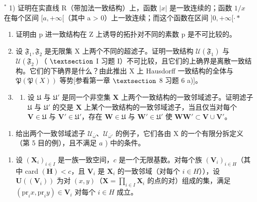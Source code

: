 \BourbakiExerciseGroup

\(^{*}\) 1) 证明在实直线 R（带加法一致结构）上，函数 \(|x|\) 是一致连续的；函数 \(1/x\) 在每个区间 \([a, +\infty[\)（其中 a \textgreater{} 0）上一致连续；而这个函数在区间 \(]0, +\infty[\cdot*\)

\begin{enumerate}
\def\labelenumi{\arabic{enumi})}
\setcounter{enumi}{1}
\item
  证明由 p 进一致结构在 Z 上诱导的拓扑对不同的素数 p 是不可比较的。
\item
  设 \(\mathfrak{F}_1, \mathfrak{F}_2\) 是无限集 X 上两个不同的超滤子。证明一致结构 \(\mathcal{U}(\mathfrak{F}_1)\) 与 \(\mathcal{U}(\mathfrak{F}_2)\)（ \(\S\) I 习题 I）不可比较，且它们的上确界是离散一致结构。它们的下确界是什么？由此推出 X 上 Hausdorff 一致结构的全体与 \(\mathfrak{P}(\mathfrak{P}(X))\) 等势{[}参看第一章 \(\S\) 8 习题 6 a){]}。
\item
  \begin{enumerate}
  \def\labelenumii{\alph{enumii})}
  \tightlist
  \item
    设 \(\mathfrak{U}\) 与 \(\mathfrak{U}'\) 是同一个非空集 \(\mathbf{X}\) 上两个一致结构的一致邻域滤子。证明滤子 \(\mathfrak{U}\) 与 \(\mathfrak{U}'\) 的交是 \(\mathbf{X}\) 上某个一致结构的一致邻域滤子，当且仅当对每个 \(\mathbf{V} \in \mathfrak{U}\) 与 \(\mathbf{V}' \in \mathfrak{U}'\)，存在 \(\mathbf{W} \in \mathfrak{U}\) 与 \(\mathbf{W}' \in \mathfrak{U}'\) 使 \(\mathbf{WW}' \subset \mathbf{V} \cup \mathbf{V}'\)。
  \end{enumerate}
\end{enumerate}

\begin{enumerate}
\def\labelenumi{\alph{enumi})}
\setcounter{enumi}{1}
\tightlist
\item
  给出两个一致邻域滤子 \(\mathcal{U}_{\overline{\omega}}\)、\(\mathcal{U}_{\overline{\omega}'}\) 的例子，它们各由 X 的一个有限分拆定义（第 5 目的例），且不满足 \(a\) ) 中的条件。
\end{enumerate}

\begin{enumerate}
\def\labelenumi{\arabic{enumi})}
\setcounter{enumi}{4}
\tightlist
\item
  设 \((\mathbf{X}_i)_{i\in I}\) 是一族一致空间，\(c\) 是一个无限基数。对每个族 \((\mathbf{V}_i)_{i\in H}\)（其中 card \((\mathbf{H}) < c\)，且 \(\mathbf{V}_i\) 是 \(\mathbf{X}_i\) 的一致邻域（对每个 \(i\in H\)）），设 \(\mathbf{U}((\mathbf{V}_i))\) 为对 \((x,y)\)（\(\mathbf{X} = \prod_{i \in I}\mathbf{X}_i\) 的点的对）组成的集，满足 \((\mathrm{pr}_i x, \mathrm{pr}_i y) \in \mathbf{V}_i\) 对每个 \(i\in H\) 成立。
\end{enumerate}

